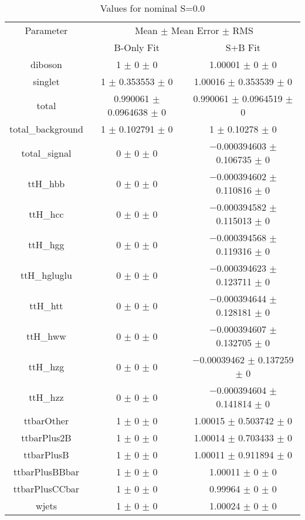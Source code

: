 \begin{table}
\centering
\caption{Values for nominal S=0.0}
\begin{tabular}{ccc}
\toprule
Parameter & \multicolumn{2}{c}{Mean $\pm$ Mean Error $\pm$ RMS}\\
 & B-Only Fit & S+B Fit\\
\midrule
diboson & \num{1} $\pm$ \num{0} $\pm$ \num{0} & \num{1.00001} $\pm$ \num{0} $\pm$ \num{0}\\
singlet & \num{1} $\pm$ \num{0.353553} $\pm$ \num{0} & \num{1.00016} $\pm$ \num{0.353539} $\pm$ \num{0}\\
total & \num{0.990061} $\pm$ \num{0.0964638} $\pm$ \num{0} & \num{0.990061} $\pm$ \num{0.0964519} $\pm$ \num{0}\\
total\_background & \num{1} $\pm$ \num{0.102791} $\pm$ \num{0} & \num{1} $\pm$ \num{0.10278} $\pm$ \num{0}\\
total\_signal & \num{0} $\pm$ \num{0} $\pm$ \num{0} & \num{-0.000394603} $\pm$ \num{0.106735} $\pm$ \num{0}\\
ttH\_hbb & \num{0} $\pm$ \num{0} $\pm$ \num{0} & \num{-0.000394602} $\pm$ \num{0.110816} $\pm$ \num{0}\\
ttH\_hcc & \num{0} $\pm$ \num{0} $\pm$ \num{0} & \num{-0.000394582} $\pm$ \num{0.115013} $\pm$ \num{0}\\
ttH\_hgg & \num{0} $\pm$ \num{0} $\pm$ \num{0} & \num{-0.000394568} $\pm$ \num{0.119316} $\pm$ \num{0}\\
ttH\_hgluglu & \num{0} $\pm$ \num{0} $\pm$ \num{0} & \num{-0.000394623} $\pm$ \num{0.123711} $\pm$ \num{0}\\
ttH\_htt & \num{0} $\pm$ \num{0} $\pm$ \num{0} & \num{-0.000394644} $\pm$ \num{0.128181} $\pm$ \num{0}\\
ttH\_hww & \num{0} $\pm$ \num{0} $\pm$ \num{0} & \num{-0.000394607} $\pm$ \num{0.132705} $\pm$ \num{0}\\
ttH\_hzg & \num{0} $\pm$ \num{0} $\pm$ \num{0} & \num{-0.00039462} $\pm$ \num{0.137259} $\pm$ \num{0}\\
ttH\_hzz & \num{0} $\pm$ \num{0} $\pm$ \num{0} & \num{-0.000394604} $\pm$ \num{0.141814} $\pm$ \num{0}\\
ttbarOther & \num{1} $\pm$ \num{0} $\pm$ \num{0} & \num{1.00015} $\pm$ \num{0.503742} $\pm$ \num{0}\\
ttbarPlus2B & \num{1} $\pm$ \num{0} $\pm$ \num{0} & \num{1.00014} $\pm$ \num{0.703433} $\pm$ \num{0}\\
ttbarPlusB & \num{1} $\pm$ \num{0} $\pm$ \num{0} & \num{1.00011} $\pm$ \num{0.911894} $\pm$ \num{0}\\
ttbarPlusBBbar & \num{1} $\pm$ \num{0} $\pm$ \num{0} & \num{1.00011} $\pm$ \num{0} $\pm$ \num{0}\\
ttbarPlusCCbar & \num{1} $\pm$ \num{0} $\pm$ \num{0} & \num{0.99964} $\pm$ \num{0} $\pm$ \num{0}\\
wjets & \num{1} $\pm$ \num{0} $\pm$ \num{0} & \num{1.00024} $\pm$ \num{0} $\pm$ \num{0}\\
\bottomrule
\end{tabular}
\end{table}